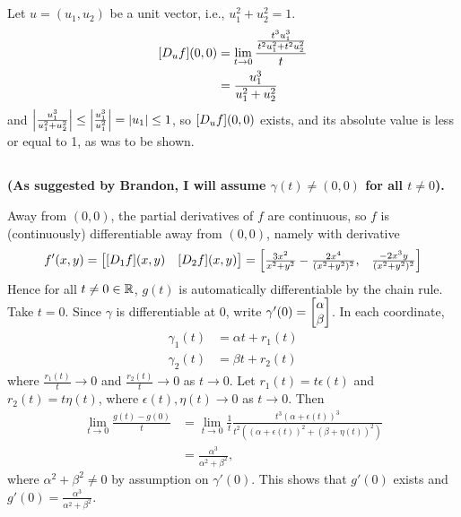 \documentclass[12pt]{article}
\begin{document}
\subsection{}
Let $u = (u_1, u_2)$ be a unit vector, 
i.e., $u_{1}^{2} + u_{2}^{2} = 1$. 
\begin{align*}
  [D_{u}f](0, 0) & = \lim_{t \rightarrow 0} \frac{\frac{t^3 u_{1}^{3}}{t^2 u_{1}^{2} + t^2 u_{2}^{2}}}{t} \\ 
                   & = \frac{u_{1}^{3}}{u_{1}^{2} + u_{2}^{2}} 
\end{align*}
and $\left|\frac{u_{1}^{3}}{u_{1}^{2} + u_{2}^{2}}\right| \leq \left|\frac{u_{1}^{3}}{u_{1}^{2}}\right| = \left|u_1\right| \leq 1$, 
so $[D_{u}f](0, 0)$ exists, and its absolute value is less or equal to 1, as was to be shown. 

\subsection{}
\textbf{(As suggested by Brandon, I will assume $\gamma(t) \neq (0, 0)$ for all $t \neq 0$).}

Away from $(0, 0)$, the partial derivatives of $f$ are continuous, so $f$ is (continuously) differentiable away from $(0, 0)$, namely with derivative 
$$f'(x, y) = \begin{bmatrix}[D_{1}f](x, y) & [D_{2}f](x, y)\end{bmatrix} = \begin{bmatrix}\frac{3x^2}{x^2 + y^2} - \frac{2x^4}{(x^2 + y^2)^2}, & \frac{-2x^3 y}{(x^2 + y^2)^2}\end{bmatrix}$$
Hence for all $t \neq 0 \in \mathbb{R}$, $g(t)$ is automatically differentiable by the chain rule. 
Take $t = 0$. 
Since $\gamma$ is differentiable at $0$, write $\gamma'(0) = \begin{bmatrix}\alpha \\ \beta\end{bmatrix}$. 
In each coordinate, 
\begin{align*}
  \gamma_{1}(t) & = \alpha t + r_1(t) \\ 
  \gamma_2(t) & = \beta t + r_{2}(t)
\end{align*}
where $\frac{r_1(t)}{t} \rightarrow 0$ and $\frac{r_{2}(t)}{t} \rightarrow 0$ as $t \rightarrow 0$. 
Let $r_{1}(t) = t\epsilon(t)$ and $r_{2}(t) = t\eta(t)$, where $\epsilon(t), \eta(t) \rightarrow 0$ as $t \rightarrow 0$. 
Then 
\begin{align}
  \lim_{t \rightarrow 0} \frac{g(t) - g(0)}{t} 
  & = \lim_{t \rightarrow 0} \frac{1}{t} \frac{t^{3}(\alpha + \epsilon(t))^{3}}{t^2 ((\alpha + \epsilon(t))^2 + (\beta + \eta(t))^2)} \nonumber \\ 
  & = \frac{\alpha^3}{\alpha^2 + \beta^2}, \label{eq:14_atzero}
\end{align}
where $\alpha^2 + \beta^2 \neq 0$ by assumption on $\gamma'(0)$. 
This shows that $g'(0)$ exists and $g'(0) = \frac{\alpha^3}{\alpha^2 + \beta^2}$. 
\end{document}
